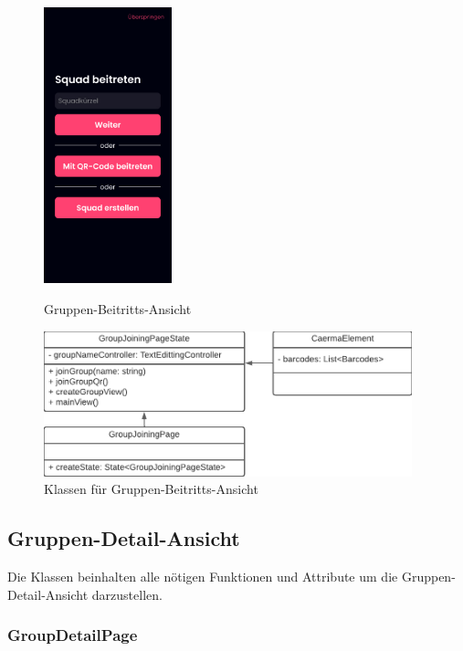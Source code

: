 \documentclass[parskip=full]{scrartcl}
\begin{document}
    \begin{figure}[htp]
        \begin{minipage}
            [t]{0.49\textwidth}
            \centering
            \includegraphics[height=80mm]{images/Presentation-layer/GroupJoiningView.jpg}
            \caption{Gruppen-Beitritts-Ansicht}
        \end{minipage}
        \begin{minipage}
            [t]{0.49\textwidth}
            \centering
            \includegraphics[width=0.95\textwidth]{images/Presentation-layer/GroupJoiningViewClass.pdf}
            \caption{Klassen für Gruppen-Beitritts-Ansicht}
        \end{minipage}
    \end{figure}    
        
    \newpage

\subsection{Gruppen-Detail-Ansicht}
    Die Klassen beinhalten alle nötigen Funktionen und Attribute um die Gruppen-Detail-Ansicht darzustellen.

    \subsubsection{GroupDetailPage}
\end{document}
